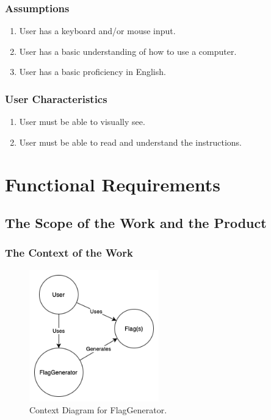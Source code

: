 \documentclass[12pt, titlepage]{article}
\begin{document}
\subsubsection{Assumptions}

\begin{enumerate}
  \item User has a keyboard and/or mouse input.
  \item User has a basic understanding of how to use a computer.
  \item User has a basic proficiency in English.
\end{enumerate}

\subsubsection{User Characteristics}

\begin{enumerate}
    \item User must be able to visually see.
    \item User must be able to read and understand the instructions.
\end{enumerate}

\pagebreak

\section{Functional Requirements}

\subsection{The Scope of the Work and the Product}

\subsubsection{The Context of the Work}

\begin{figure}[h!]
    \centering
    \includegraphics[width=0.5\textwidth]{FRs_WorkContext.png}
    \caption{Context Diagram for FlagGenerator.}
    \label{fig:FRs_WC}
\end{figure}
\end{document}

